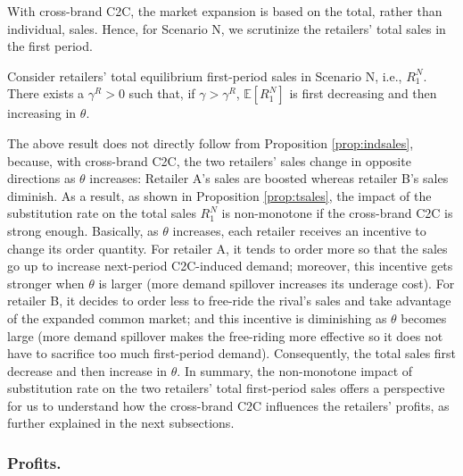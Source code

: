 \documentclass[nonblindrev,copyedit]{informs1}
\begin{document}
With cross-brand C2C, the market expansion is based on the total, rather than individual, sales. Hence, for Scenario N, we scrutinize the retailers' total sales in the first period.
\begin{proposition}
\label{prop:tsales}
Consider retailers' total equilibrium first-period sales in Scenario N, i.e., $R_{1}^N$. There exists a $\gamma^R > 0$ such that, if $\gamma > \gamma^R$, $\mathbb{E} [R^{N}_{1}]$ is first decreasing and then increasing in $\theta$.
\end{proposition}

The above result does not directly follow from Proposition \ref{prop:indsales}, because, with cross-brand C2C, the two retailers' sales change in opposite directions as $\theta$ increases: Retailer A's sales are boosted whereas retailer B's sales diminish. As a result, as shown in Proposition \ref{prop:tsales}, the impact of the substitution rate on the total sales $R_{1}^N$ is non-monotone if the cross-brand C2C is strong enough. Basically, as $\theta$ increases, each retailer receives an incentive to change its order quantity. For retailer A, it tends to order more so that the sales go up to increase next-period C2C-induced demand; moreover, this incentive gets stronger when $\theta$ is larger (more demand spillover increases its underage cost). For retailer B, it decides to order less to free-ride the rival's sales and take advantage of the expanded common market; and this incentive is diminishing as $\theta$ becomes large (more demand spillover makes the free-riding more effective so it does not have to sacrifice too much first-period demand). Consequently, the total sales first decrease and then increase in $\theta$. In summary, the non-monotone impact of substitution rate on the two retailers' total first-period sales offers a perspective for us to understand how the cross-brand C2C influences the retailers' profits, as further explained in the next subsections.

\subsubsection{Profits.}\label{sec:compare}
\end{document}

